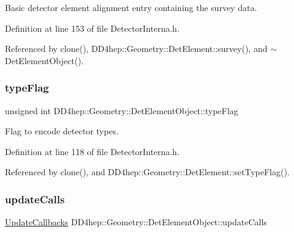 Basic detector element alignment entry containing the survey data. 



Definition at line 153 of file Detector\+Interna.\+h.



Referenced by clone(), D\+D4hep\+::\+Geometry\+::\+Det\+Element\+::survey(), and $\sim$\+Det\+Element\+Object().

\hypertarget{class_d_d4hep_1_1_geometry_1_1_det_element_object_a0038f8f124cb13a1cca03af95964dcf5}{}\label{class_d_d4hep_1_1_geometry_1_1_det_element_object_a0038f8f124cb13a1cca03af95964dcf5} 
\subsubsection{\texorpdfstring{type\+Flag}{typeFlag}}
{\footnotesize\ttfamily unsigned int D\+D4hep\+::\+Geometry\+::\+Det\+Element\+Object\+::type\+Flag}



Flag to encode detector types. 



Definition at line 118 of file Detector\+Interna.\+h.



Referenced by clone(), and D\+D4hep\+::\+Geometry\+::\+Det\+Element\+::set\+Type\+Flag().

\hypertarget{class_d_d4hep_1_1_geometry_1_1_det_element_object_a95a0d42e4b0410c815ba45eceb2e76a3}{}\label{class_d_d4hep_1_1_geometry_1_1_det_element_object_a95a0d42e4b0410c815ba45eceb2e76a3} 
\subsubsection{\texorpdfstring{update\+Calls}{updateCalls}}
{\footnotesize\ttfamily \hyperlink{class_d_d4hep_1_1_geometry_1_1_det_element_object_aa3bda3e351cc13f5bcce906a67d21872}{Update\+Callbacks} D\+D4hep\+::\+Geometry\+::\+Det\+Element\+Object\+::update\+Calls}



